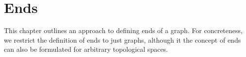 \chapter{Ends}

This chapter outlines an approach to defining ends of a graph. For concreteness, we restrict the definition of ends to just graphs, although it the concept of ends can also be formulated for arbitrary topological spaces.
